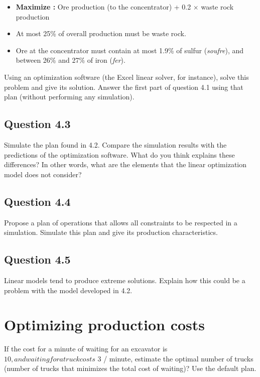 \documentclass[letterpaper,12pt]{article}
\begin{document}
	\begin{itemize}
		\item \textbf{Maximize : } Ore production (to the concentrator) + 0.2 $\times$ waste rock production
		\item At most 25\% of overall production must be waste rock.
		\item Ore at the concentrator must contain at most 1.9\% of sulfur (\textit{soufre}), and between 26\% and 27\% of iron (\textit{fer}).
	\end{itemize}
	
	Using an optimization software (the Excel linear solver, for instance), solve this problem and give its solution. Answer the first part of question 4.1 using that plan (without performing any simulation).

	
	\subsection*{Question 4.3}
	
	Simulate the plan found in 4.2. Compare the simulation results with the predictions of the optimization software. What do you think explains these differences? In other words, what are the elements that the linear optimization model does not consider?

	
	\subsection*{Question 4.4}
	
	Propose a plan of operations that allows all constraints to be respected in a simulation. Simulate this plan and give its production characteristics.
	
	\subsection*{Question 4.5}
	Linear models tend to produce extreme solutions. Explain how this could be a problem with the model developed in 4.2.
	
	
	
	
	
	
	\section{Optimizing production costs}
	
	If the cost for a minute of waiting for an excavator is $ 10, and waiting for a truck costs $ 3 / minute, estimate the optimal number of trucks (number of trucks that minimizes the total cost of waiting)? Use the default plan.
	
\end{document}
